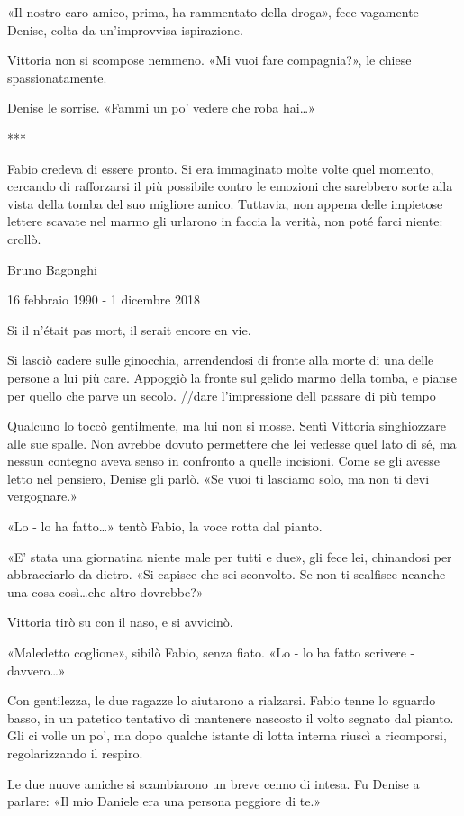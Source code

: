 «Il nostro caro amico, prima, ha rammentato della droga», fece vagamente Denise, colta da un'improvvisa ispirazione.

Vittoria non si scompose nemmeno. «Mi vuoi fare compagnia?», le chiese spassionatamente.

Denise le sorrise. «Fammi un po' vedere che roba hai\ldots»

***

Fabio credeva di essere pronto. Si era immaginato molte volte quel momento, cercando di rafforzarsi il più possibile contro le emozioni che sarebbero sorte alla vista della tomba del suo migliore amico. Tuttavia, non appena delle impietose lettere scavate nel marmo gli urlarono in faccia la verità, non poté farci niente: crollò.

Bruno Bagonghi

16 febbraio 1990 - 1 dicembre 2018

Si il n'était pas mort, il serait encore en vie.

Si lasciò cadere sulle ginocchia, arrendendosi di fronte alla morte di una delle persone a lui più care. Appoggiò la fronte sul gelido marmo della tomba, e pianse per quello che parve un secolo. //dare l'impressione dell passare di più tempo

Qualcuno lo toccò gentilmente, ma lui non si mosse. Sentì Vittoria singhiozzare alle sue spalle. Non avrebbe dovuto permettere che lei vedesse quel lato di sé, ma nessun contegno aveva senso in confronto a quelle incisioni. Come se gli avesse letto nel pensiero, Denise gli parlò. «Se vuoi ti lasciamo solo, ma non ti devi vergognare.»

«Lo - lo ha fatto\ldots» tentò Fabio, la voce rotta dal pianto.

«E' stata una giornatina niente male per tutti e due», gli fece lei, chinandosi per abbracciarlo da dietro. «Si capisce che sei sconvolto. Se non ti scalfisce neanche una cosa così\ldots che altro dovrebbe?»

Vittoria tirò su con il naso, e si avvicinò.

«Maledetto coglione», sibilò Fabio, senza fiato. «Lo - lo ha fatto scrivere - davvero\ldots»

Con gentilezza, le due ragazze lo aiutarono a rialzarsi. Fabio tenne lo sguardo basso, in un patetico tentativo di mantenere nascosto il volto segnato dal pianto. Gli ci volle un po', ma dopo qualche istante di lotta interna riuscì a ricomporsi, regolarizzando il respiro.

Le due nuove amiche si scambiarono un breve cenno di intesa. Fu Denise a parlare: «Il mio Daniele era una persona peggiore di te.»

